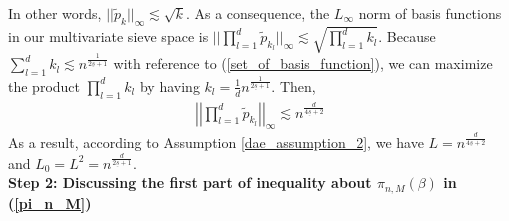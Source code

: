          In other words, $||\tilde{p}_k||_{\infty} \lesssim \sqrt{k}$. As a consequence, the $L_{\infty}$ norm of basis functions in our multivariate sieve space is $||\prod_{l=1}^d \tilde{p}_{k_l}||_{\infty} \lesssim \sqrt{\prod_{l=1}^dk_l}$. Because $\sum_{l=1}^dk_l \lesssim n^{\frac{1}{2\underline{s}+1}}$ with reference to (\ref{set_of_basis_function}), we can maximize the product $\prod_{l=1}^dk_l$ by having $k_l=\frac{1}{d}n^{\frac{1}{2\underline{s}+1}}$. Then,
         \begin{align*}
             \left|\left|\prod_{l=1}^d \tilde{p}_{k_l}\right|\right|_{\infty} \lesssim n^{\frac{d}{4\underline{s}+2}}
         \end{align*}
         As a result, according to Assumption \ref{dae_assumption_2}, we have $L=n^{\frac{d}{4\underline{s}+2}}$ and $L_0=L^2=n^{\frac{d}{2\underline{s}+1}}$.\\

        \textbf{Step 2: Discussing the first part of inequality about $\pi_{n,M}(\beta)$ in (\ref{pi_n_M})}
        
